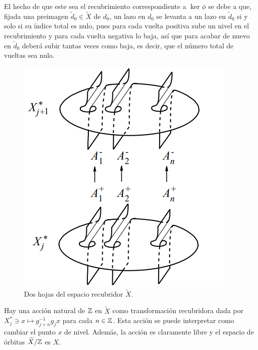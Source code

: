 \documentclass[TFG.tex]{subfiles}
\begin{document}

El hecho de que este sea el recubrimiento correspondiente a $\ker\phi$ se debe a que, fijada una preimagen $\tilde{d}_0\in\widetilde{X}$ de $d_0$, un lazo en $d_0$ se levanta a un lazo en $\tilde{d}_0$ si y solo si su índice total es nulo, pues para cada vuelta positiva sube un nivel en el recubrimiento y para cada vuelta negativa lo baja, así que para acabar de nuevo en $\tilde{d}_0$ deberá subir tantas veces como baja, es decir, que el número total de vueltas sea nulo.\\

\vspace{0.1cm}

\begin{figure}[h!]
\includegraphics[scale=0.6]{Imagenes/recubrimiento}
\caption{Dos hojas del espacio recubridor $\widetilde{X}$.}\label{recubrimiento}
\end{figure}
Hay una acción natural de $\mathbb{Z}$ en $\widetilde{X}$ como transformación recubridora dada por $X^*_j\ni x\mapsto g_{j+n}^{-1}g_jx$ para cada $n\in\mathbb{Z}$. Esta acción se puede interpretar como cambiar el punto $x$ de nivel. Además, la acción es claramente libre y el espacio de órbitas $\widetilde{X}/\mathbb{Z}$ es $X$.%
\end{document}
